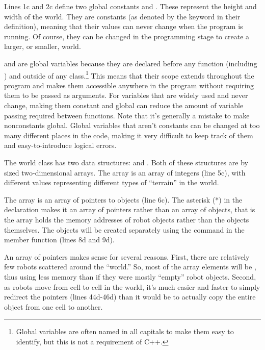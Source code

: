 
Lines 1c and 2c define two global constants  and .  These represent the height and width of the world.  They are constants (as denoted by the keyword  in their definition), meaning that their values can never change when the program is running.  Of course, they can be changed in the programming stage to create a larger, or smaller, world.

 and  are global variables because they are declared before any function (including ) and outside of any class.\footnote{Global variables are often named in all capitals to make them easy to identify, but this is not a requirement of C++.} This means that their scope extends throughout the program and makes them accessible anywhere in the program without requiring them to be passed as arguments.  For variables that are widely used and never change, making them constant and global can reduce the amount of variable passing required between functions.  Note that it's generally a mistake to make nonconstants global.  Global variables that aren't constants can be changed at too many different places in the code, making it very difficult to keep track of them and easy-to-introduce logical errors.


The world class has two data structures:  and .  Both of these structures are  by  sized two-dimensional arrays.  The  array is an array of integers (line 5c), with different values representing different types of ``terrain'' in the world.

The  array is an array of pointers to  objects (line 6c).  The asterisk (*) in the declaration makes it an array of pointers rather than an array of objects, that is the array holds the memory addresses of robot objects rather than the objects themselves.  The  objects will be created separately using the  command in the  member function (lines 8d and 9d).

An array of pointers makes sense for several reasons.  First, there are relatively few robots scattered around the ``world.''  So, most of the array elements will be , thus using less memory than if they were mostly ``empty'' robot objects.  Second, as robots move from cell to cell in the world, it's much easier and faster to simply redirect the pointers (lines 44d-46d) than it would be to actually copy the entire  object from one cell to another.

